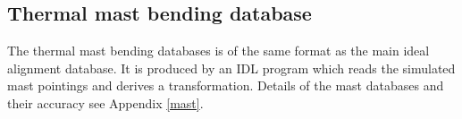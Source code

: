 \subsection{Thermal mast bending database}
The thermal mast bending databases is of the same format as the main ideal alignment database. It is produced by an IDL program which reads the simulated mast pointings and derives a transformation. Details of the mast databases and their accuracy see Appendix \ref{mast}.


